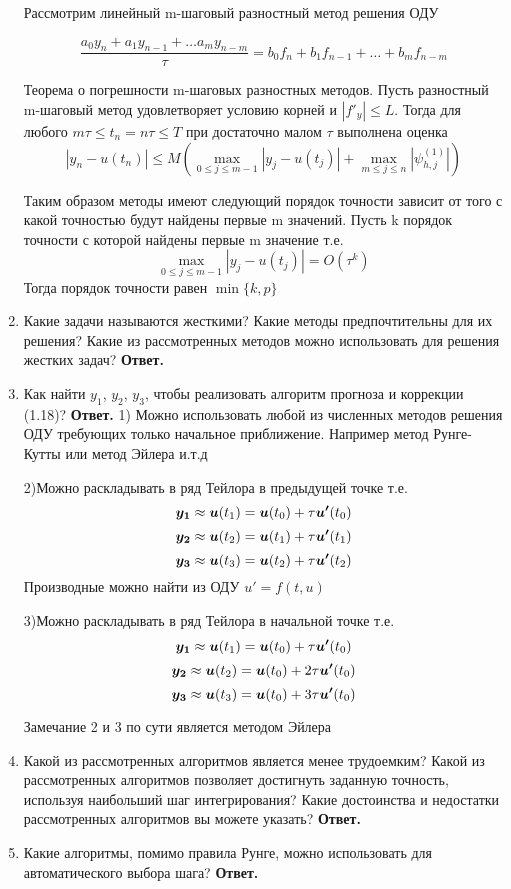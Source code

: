\documentclass{article}
\renewcommand{\vec}[1]{\text{\mathversion{bold}${#1}$}}%
\begin{document}
\begin{enumerate}
	
	Рассмотрим линейный m-шаговый разностный метод решения ОДУ
	
	
	\[
	\frac{a_0y_n+a_1y_{n-1}+ \ldots a_my_{n-m}}{\tau} = b_0f_n+b_1f_{n-1}+ \ldots + b_mf_{n-m}
	\]
	
	Теорема о погрешности  m-шаговых разностных методов. Пусть разностный m-шаговый метод удовлетворяет условию корней и $|f'_y| \le L$. Тогда для любого $m\tau \le t_n =n\tau \le T$ при достаточно малом $\tau$ выполнена оценка
	\[
	|y_n-u(t_n)| \le M \left( \max\limits_{0\le j\le m-1}|y_j-u(t_j)|+\max \limits_{m\le j \le n}|\psi_{h,j}^{(1)}|\right)
	\]
	
	
	Таким образом методы имеют следующий порядок точности зависит от того с какой точностью будут найдены первые m значений. Пусть k порядок точности с которой найдены первые m значение т.е. 
	\[
	\max\limits_{0\le j\le m-1}|y_j-u(t_j)| = O(\tau^k)
	\]
	Тогда порядок точности равен $\min\{k, p\}$
        \item Какие задачи называются жесткими? Какие методы предпочтительны для их решения? Какие из рассмотренных
        методов можно использовать для решения жестких задач?
        \newline
        {\bfseries Ответ. } 
        
        \item Как найти $y_1$, $y_2$, $y_3$, чтобы реализовать алгоритм прогноза
        и коррекции (1.18)?
        \newline
        {\bfseries Ответ. } 
        1) Можно использовать любой из численных методов решения ОДУ требующих только начальное приближение. Например метод Рунге-Кутты или метод Эйлера и.т.д
	
	
	2)Можно раскладывать в ряд Тейлора в предыдущей точке т.е. 
	\[
	\vec{y_1} \approx \vec{u}(t_1) = \vec{u}(t_0) + \tau \vec{u'}(t_0)
	\]
	\[
	\vec{y_2} \approx \vec{u}(t_2) = \vec{u}(t_1) + \tau \vec{u'}(t_1)
	\]
	\[
	\vec{y_3} \approx \vec{u}(t_3) = \vec{u}(t_2) + \tau \vec{u'}(t_2)
	\]
	Производные можно найти из ОДУ $u'=f(t,u)$
	
	3)Можно раскладывать в ряд Тейлора в начальной точке т.е. 
	\[
	\vec{y_1} \approx \vec{u}(t_1) = \vec{u}(t_0) + \tau \vec{u'}(t_0)
	\]
	\[
	\vec{y_2} \approx \vec{u}(t_2) = \vec{u}(t_0) + 2\tau \vec{u'}(t_0)
	\]
	\[
	\vec{y_3} \approx \vec{u}(t_3) = \vec{u}(t_0) + 3\tau \vec{u'}(t_0)
	\]
	
	
	Замечание 2 и 3 по сути является методом Эйлера
        \item Какой из рассмотренных алгоритмов является менее трудоемким? Какой из рассмотренных алгоритмов позволяет достигнуть заданную точность, используя наибольший
        шаг интегрирования? Какие достоинства и недостатки рассмотренных алгоритмов вы можете указать?
        \newline
        {\bfseries Ответ. } 
        \item Какие алгоритмы, помимо правила Рунге, можно использовать для автоматического выбора шага?
        \newline
        {\bfseries Ответ. } 
        
    \end{enumerate}
\end{document}
